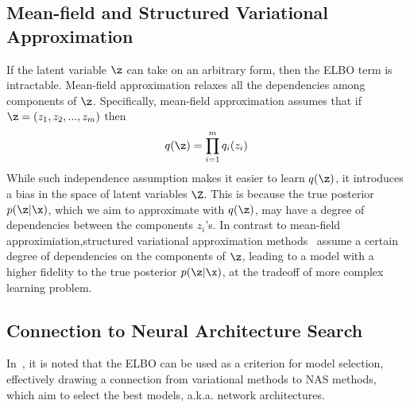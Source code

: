 \subsection{\label{sec:mean_field_and_structured}Mean-field and Structured Variational Approximation}
If the latent variable $\z$ can take on an arbitrary form, then the ELBO term
is intractable. Mean-field approximation relaxes all the dependencies among
components of $\z$. Specifically, mean-field approximation assumes that if $\z
= (z_1, z_2, ..., z_m)$ then
\begin{align}
  q(\z) = \prod_{i=1}^{m} q_i(z_i)
\end{align}
While such independence assumption makes it easier to learn $q(\z)$, it
introduces a bias in the space of latent variables $\Z$. This is because the
true posterior $p(\z | \x)$, which we aim to approximate with $q(\z)$, may have
a degree of dependencies between the components $z_i$'s. In contrast to
mean-field approximiation,structured variational approximation
methods~\citep{struct_approx} assume a certain degree of dependencies on the
components of $\z$, leading to a model with a higher fidelity to the true
posterior $p(\z | \x)$, at the tradeoff of more complex learning problem.

\subsection{\label{sec:bayesian_nas}Connection to Neural Architecture Search}
In~\cite{variational_inference_reviews}, it is noted that the ELBO
can be used as a criterion for model selection, effectively drawing a
connection from variational methods to NAS methods, which aim to select the
best models, a.k.a.  network architectures.


